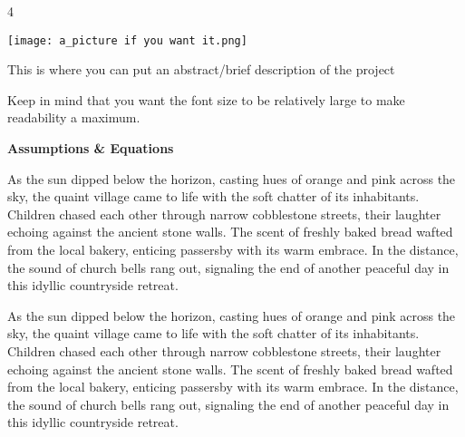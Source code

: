 \documentclass[a0]{4by3}
\newcommand{\NumColumns}{4}
\begin{document}

\color{black}
\noindent
\begin{minipage}{\linewidth + 2\fboxsep}
\begin{multicols*}{\NumColumns}
        \begin{center}
          \texttt{[image: a\_picture if you want it.png]}
        \end{center}
        
        \large
       This is where you can put an abstract/brief description of the project

Keep in mind that you want the font size to be relatively large to make readability a maximum.



    
        \begin{center}
        \LARGE{\textbf{Assumptions \& Equations}}
        \end{center}
        \vspace{5mm}
            \large
        
            

As the sun dipped below the horizon, casting hues of orange and pink across the sky, the quaint village came to life with the soft chatter of its inhabitants. Children chased each other through narrow cobblestone streets, their laughter echoing against the ancient stone walls. The scent of freshly baked bread wafted from the local bakery, enticing passersby with its warm embrace. In the distance, the sound of church bells rang out, signaling the end of another peaceful day in this idyllic countryside retreat.


As the sun dipped below the horizon, casting hues of orange and pink across the sky, the quaint village came to life with the soft chatter of its inhabitants. Children chased each other through narrow cobblestone streets, their laughter echoing against the ancient stone walls. The scent of freshly baked bread wafted from the local bakery, enticing passersby with its warm embrace. In the distance, the sound of church bells rang out, signaling the end of another peaceful day in this idyllic countryside retreat.











\end{multicols*}
\end{minipage}
\end{document}
